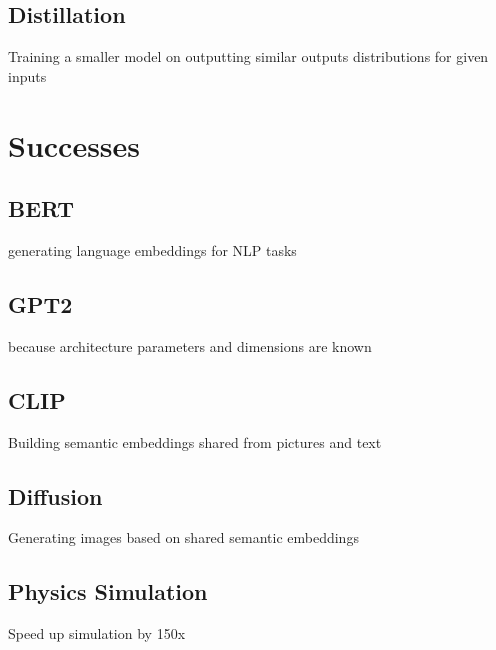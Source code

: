 \subsection{Distillation}
\begin{frame}[c]
    Training a smaller model on outputting similar outputs distributions for given inputs
\end{frame}


\section{Successes}
\subsection{BERT}
\begin{frame}[c]
    generating language embeddings for NLP tasks
\end{frame}

\subsection{GPT2}
\begin{frame}[c]
    because architecture parameters and dimensions are known
\end{frame}

\subsection{CLIP}
\begin{frame}[c]
    Building semantic embeddings shared from pictures and text
\end{frame}

\subsection{Diffusion}
\begin{frame}[c]
    Generating images based on shared semantic embeddings
\end{frame}

\subsection{Physics Simulation}
\begin{frame}[c]
    Speed up simulation by 150x \cite{wiewel_latent_2019}
\end{frame}
